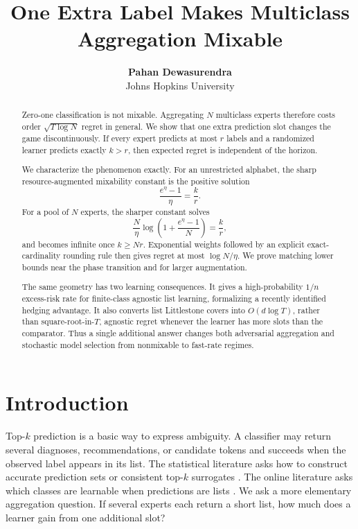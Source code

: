 \documentclass{article}
\title{One Extra Label Makes Multiclass Aggregation Mixable}
\author{\textbf{Pahan Dewasurendra} \\ Johns Hopkins University}
\theoremstyle{definition}
\theoremstyle{remark}
\newcommand{\1}{\mathbf 1}
\begin{document}
\maketitle

\begin{abstract}
Zero-one classification is not mixable. Aggregating \(N\) multiclass experts therefore costs order \(\sqrt{T\log N}\) regret in general. We show that one extra prediction slot changes the game discontinuously. If every expert predicts at most \(r\) labels and a randomized learner predicts exactly \(k>r\), then expected regret is independent of the horizon.

We characterize the phenomenon exactly. For an unrestricted alphabet, the sharp resource-augmented mixability constant is the positive solution \[ \frac{e^\eta-1}{\eta}=\frac{k}{r}. \] For a pool of \(N\) experts, the sharper constant solves \[ \frac N\eta\log\left(1+\frac{e^\eta-1}{N}\right)=\frac{k}{r}, \] and becomes infinite once \(k\ge Nr\). Exponential weights followed by an explicit exact-cardinality rounding rule then gives regret at most \(\log N/\eta\). We prove matching lower bounds near the phase transition and for larger augmentation.

The same geometry has two learning consequences. It gives a high-probability \(1/n\) excess-risk rate for finite-class agnostic list learning, formalizing a recently identified hedging advantage. It also converts list Littlestone covers into \(O(d\log T)\), rather than square-root-in-\(T\), agnostic regret whenever the learner has more slots than the comparator. Thus a single additional answer changes both adversarial aggregation and stochastic model selection from nonmixable to fast-rate regimes.
\end{abstract}

\section{Introduction}

Top-\(k\) prediction is a basic way to express ambiguity. A classifier may return several diagnoses, recommendations, or candidate tokens and succeeds when the observed label appears in its list. The statistical literature asks how to construct accurate prediction sets or consistent top-\(k\) surrogates \citep{yang2020topk,cortes2024cardinality}. The online literature asks which classes are learnable when predictions are lists \citep{moran2023list}. We ask a more elementary aggregation question. If several experts each return a short list, how much does a learner gain from one additional slot?
\end{document}
